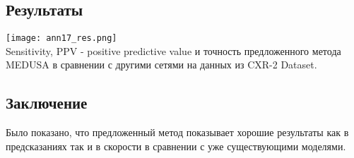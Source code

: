 \subsection*{Результаты}
\begin{minipage}{1.0\linewidth}
    \begin{center}
        \texttt{[image: ann17\_res.png]} \\
        \caption{\scriptsize{
            Sensitivity, PPV - positive predictive value и точность предложенного метода MEDUSA 
            в сравнении с другими сетями на данных из CXR-2 Dataset.
        }}
    \end{center}
    
\end{minipage} 
\subsection*{Заключение}
Было показано, что предложенный метод показывает хорошие результаты как в предсказаниях так и в скорости в сравнении с 
уже существующими моделями.